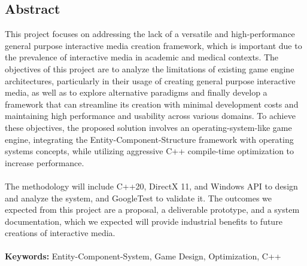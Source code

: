 \begin{adjustwidth}{0.5cm}{0.5cm}
    \section*{\normalsize Abstract}
    \vspace{-0.3cm}
    \normalsize
    This project focuses on addressing the lack of a versatile and high-performance general purpose interactive media
    creation framework, which is important due to the prevalence of interactive media in academic and medical contexts.
    The objectives of this project are to analyze the limitations of existing game engine architectures, particularly
    in their usage of creating general purpose interactive media, as well as to explore alternative paradigms and
    finally develop a framework that can streamline its creation with minimal development costs and maintaining high
    performance and usability across various domains.
    To achieve these objectives, the proposed solution involves an operating-system-like game engine, integrating
    the Entity-Component-Structure framework with operating systems concepts, while utilizing aggressive C++ compile-time
    optimization to increase performance.
    \\\\
    The methodology will include C++20, DirectX 11, and Windows API to design and analyze the system, and
    GoogleTest to validate it.
    The outcomes we expected from this project are a proposal, a deliverable prototype, and a system documentation,
    which we expected will provide industrial benefits to future creations of interactive media.
    \\\\
    \textbf{Keywords:} Entity-Component-System, Game Design, Optimization, C++

\end{adjustwidth}
